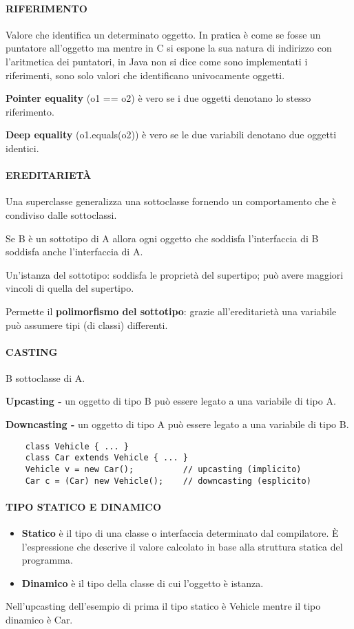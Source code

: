 \documentclass[a4paper, 12pt]{article}
\begin{document}
\paragraph{RIFERIMENTO}
Valore che identifica un determinato oggetto. In pratica è come se fosse un puntatore 
all'oggetto ma mentre in C si espone la sua natura di indirizzo con l'aritmetica dei
puntatori, in Java non si dice come sono implementati i riferimenti, sono solo valori
che identificano univocamente oggetti.

\textbf{Pointer equality} (o1 == o2) è vero se i due oggetti denotano lo stesso
riferimento.

\textbf{Deep equality} (o1.equals(o2)) è vero se le due variabili denotano due oggetti
identici.

\paragraph{EREDITARIETÀ}
Una superclasse generalizza una sottoclasse fornendo un comportamento che è condiviso
dalle sottoclassi.

Se B è un sottotipo di A allora ogni oggetto che soddisfa l'interfaccia di B soddisfa
anche l'interfaccia di A.

Un'istanza del sottotipo: soddisfa le proprietà del supertipo; può avere maggiori vincoli
di quella del supertipo.

Permette il \textbf{polimorfismo del sottotipo}: grazie all'ereditarietà una variabile può
assumere tipi (di classi) differenti.

\paragraph{CASTING}
B sottoclasse di A.

\textbf{Upcasting -} un oggetto di tipo B può essere legato a una variabile di tipo A.

\textbf{Downcasting -} un oggetto di tipo A può essere legato a una variabile di tipo B.
\begin{lstlisting}
    class Vehicle { ... }
    class Car extends Vehicle { ... }
    Vehicle v = new Car();          // upcasting (implicito)
    Car c = (Car) new Vehicle();    // downcasting (esplicito)
\end{lstlisting}

\paragraph{TIPO STATICO E DINAMICO}
\begin{itemize}
    \item \textbf{Statico} è il tipo di una classe o interfaccia determinato dal
    compilatore. È l'espressione che descrive il valore calcolato in base alla struttura
    statica del programma.
    \item \textbf{Dinamico} è il tipo della classe di cui l'oggetto è istanza.
\end{itemize}
Nell'upcasting dell'esempio di prima il tipo statico è Vehicle mentre il tipo
dinamico è Car.
\end{document}
